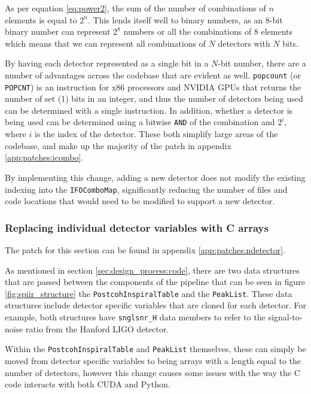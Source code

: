 \documentclass{article}
\begin{document}
As per equation \ref{eq:power2}, the sum of the number of combinations of \(n\) elements is equal to \(2^n\).
This lends itself well to binary numbers, as an 8-bit binary number can represent \(2^8\) numbers or all the combinations of 8 elements \textemdash{} which means that we can represent all combinations of \(N\) detectors with \(N\) bits.

By having each detector represented as a single bit in a \(N\)-bit number, there are a number of advantages across the codebase that are evident as well.
\texttt{popcount} (or \texttt{POPCNT}) is an instruction for x86 processors and NVIDIA GPUs that returns the number of set (1) bits in an integer, and thus the number of detectors being used can be determined with a single instruction.
In addition, whether a detector is being used can be determined using a bitwise \texttt{AND} of the combination and \(2^{i}\), where \(i\) is the index of the detector.
These both simplify large areas of the codebase, and make up the majority of the patch in appendix \ref{app:patches:icombo}.

By implementing this change, adding a new detector does not modify the existing indexing into the \texttt{IFOComboMap}, significantly reducing the number of files and code locations that would need to be modified to support a new detector.

\subsubsection{Replacing individual detector variables with C arrays} \label{sec:final_design:patches:ndetector}

The patch for this section can be found in appendix \ref{app:patches:ndetector}.

As mentioned in section \ref{sec:design_process:code}, there are two data structures that are passed between the components of the pipeline that can be seen in figure \ref{fig:spiir_structure} \textemdash{} the \texttt{PostcohInspiralTable} and the \texttt{PeakList}.
These data structures include detector specific variables that are cloned for each detector.
For example, both structures have \texttt{snglsnr\_H} data members to refer to the signal-to-noise ratio from the Hanford LIGO detector.

Within the \texttt{PostcohInspiralTable} and \texttt{PeakList} themselves, these can simply be moved from detector specific variables to being arrays with a length equal to the number of detectors, however this change causes some issues with the way the C code interacts with both CUDA and Python.
\end{document}
